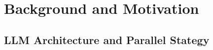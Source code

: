 \section{Background and Motivation}
\label{sec:background}

\subsection{LLM Architecture and Parallel Stategy}
\label{sec:llmandtransformer}


    
    
    

